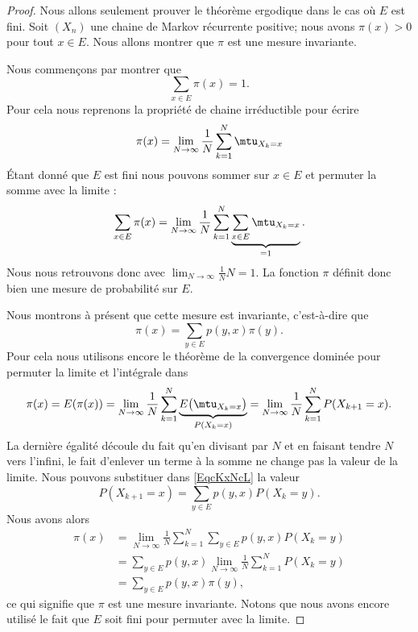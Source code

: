 \begin{proof}
	Nous allons seulement prouver le théorème ergodique dans le cas où \( E\) est fini. Soit \( (X_n)\) une chaine de Markov récurrente positive; nous avons \( \pi(x)>0\) pour tout \( x\in E\). Nous allons montrer que \( \pi\) est une mesure invariante.

	Nous commençons par montrer que
	\begin{equation}
		\sum_{x\in E}\pi(x)=1.
	\end{equation}
	Pour cela nous reprenons la propriété de chaine irréductible pour écrire
	\begin{equation}
		\pi(x)=\lim_{N\to \infty}\frac{1}{ N }\sum_{k=1}^N\mtu_{X_k=x}
	\end{equation}
	Étant donné que \( E\) est fini nous pouvons sommer sur \( x\in E\) et permuter la somme avec la limite :
	\begin{equation}
		\sum_{x\in E}\pi(x)=\lim_{N\to \infty} \frac{1}{ N }\sum_{k=1}^N\underbrace{\sum_{x\in E}\mtu_{X_k=x}}_{=1}.
	\end{equation}
	Nous nous retrouvons donc avec \( \lim_{N\to \infty} \frac{1}{ N }N=1\). La fonction \( \pi\) définit donc bien une mesure de probabilité sur \( E\).

	Nous montrons à présent que cette mesure est invariante, c'est-à-dire que
	\begin{equation}
		\pi(x)=\sum_{y\in E}p(y,x)\pi(y).
	\end{equation}
	Pour cela nous utilisons encore le théorème de la convergence dominée pour permuter la limite et l'intégrale dans
	\begin{equation}        \label{EqcKxNcL}
		\pi(x)=E(\pi(x))=\lim_{N\to \infty} \frac{1}{ N }\sum_{k=1}^N\underbrace{E\big( \mtu_{X_k=x} \big)}_{P(X_k=x)}=\lim_{N\to \infty} \frac{1}{ N }\sum_{k=1}^NP(X_{k+1}=x).
	\end{equation}
	La dernière égalité découle du fait qu'en divisant par \( N\) et en faisant tendre \( N\) vers l'infini, le fait d'enlever un terme à la somme ne change pas la valeur de la limite. Nous pouvons substituer dans \eqref{EqcKxNcL} la valeur
	\begin{equation}
		P(X_{k+1}=x)=\sum_{y\in E}p(y,x)P(X_k=y).
	\end{equation}
	Nous avons alors
	\begin{subequations}
		\begin{align}
			\pi(x) & =\lim_{N\to \infty} \frac{1}{ N }\sum_{k=1}^N\sum_{y\in E}p(y,x)P(X_k=y) \\
			       & =\sum_{y\in E}p(y,x)\lim_{N\to \infty} \frac{1}{ N }\sum_{k=1}^NP(X_k=y) \\
			       & =\sum_{y\in E}p(y,x)\pi(y),
		\end{align}
	\end{subequations}
	ce qui signifie que \( \pi\) est une mesure invariante. Notons que nous avons encore utilisé le fait que \( E\) soit fini pour permuter avec la limite.


\end{proof}

